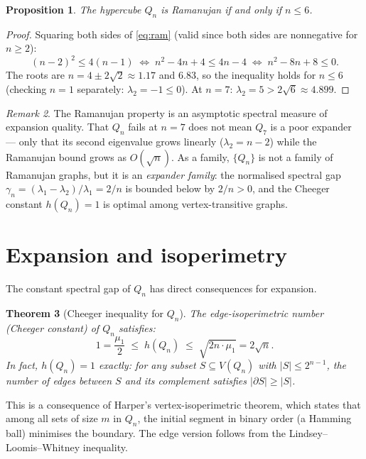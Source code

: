 \documentclass[11pt,a4paper]{article}
\theoremstyle{plain}
\newtheorem{theorem}{Theorem}
\newtheorem{proposition}[theorem]{Proposition}
\theoremstyle{definition}
\theoremstyle{remark}
\newtheorem{remark}[theorem]{Remark}
\begin{document}
\begin{proposition}
The hypercube $Q_n$ is Ramanujan if and only if $n \le 6$.
\end{proposition}

\begin{proof}
Squaring both sides of \eqref{eq:ram} (valid since both sides are
nonneg\-ative for $n \ge 2$):
\[
  (n-2)^2 \le 4(n-1)
  \;\Longleftrightarrow\;
  n^2 - 4n + 4 \le 4n - 4
  \;\Longleftrightarrow\;
  n^2 - 8n + 8 \le 0.
\]
The roots are $n = 4 \pm 2\sqrt{2} \approx 1.17$ and $6.83$, so the
inequality holds for $n \le 6$ (checking $n = 1$ separately: $\lambda_2 = -1
\le 0$). At $n = 7$: $\lambda_2 = 5 > 2\sqrt{6} \approx 4.899$.
\end{proof}

\begin{remark}
The Ramanujan property is an asymptotic spectral measure of
expansion quality. That $Q_n$ fails at $n = 7$ does not mean $Q_7$ is a poor
expander --- only that its second eigenvalue grows linearly ($\lambda_2 =
n - 2$) while the Ramanujan bound grows as $O(\sqrt{n})$. As a family,
$\{Q_n\}$ is not a family of Ramanujan graphs, but it is an
\emph{expander family}: the normalised spectral gap
$\gamma_n = (\lambda_1 - \lambda_2)/\lambda_1 = 2/n$ is bounded below
by $2/n > 0$, and the Cheeger constant $h(Q_n) = 1$ is optimal
among vertex-transitive graphs.
\end{remark}


\section{Expansion and isoperimetry}

The constant spectral gap of $Q_n$ has direct consequences for expansion.

\begin{theorem}[Cheeger inequality for $Q_n$]
The edge-isoperimetric number (Cheeger constant) of $Q_n$ satisfies:
\[
  1 = \frac{\mu_1}{2} \;\le\; h(Q_n) \;\le\; \sqrt{2n \cdot \mu_1}
  = 2\sqrt{n}.
\]
In fact, $h(Q_n) = 1$ exactly: for any subset $S \subseteq V(Q_n)$ with
$|S| \le 2^{n-1}$, the number of edges between $S$ and its complement
satisfies $|\partial S| \ge |S|$.
\end{theorem}

This is a consequence of Harper's vertex-isoperimetric theorem, which
states that among all sets of size $m$ in $Q_n$, the initial segment in
binary order (a Hamming ball) minimises the boundary. The edge version
follows from the Lindsey--Loomis--Whitney inequality.
\end{document}
